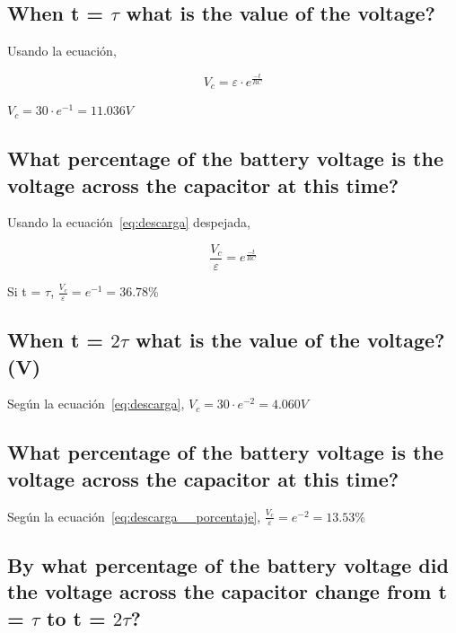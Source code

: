 \documentclass[twocolumn, 12pt]{article}
\begin{document}
\subsection{When t = $\tau$ what is the value of the voltage?}

Usando la ecuación,

{\large
        \begin{equation}
            V_c = \varepsilon \cdot e^{\frac{-t}{RC}}
        \end{equation}
        \label{eq:descarga}
    }

$V_c = 30 \cdot e^{-1} = 11.036V$

\subsection{What percentage of the battery voltage is the voltage across the capacitor at this time?}

Usando la ecuación~\eqref{eq:descarga} despejada,

{\large
        \begin{equation}
            \frac{V_c}{\varepsilon} = e^{\frac{-t}{RC}}
        \end{equation}
        \label{eq:descarga__porcentaje}
    }

Si t = $\tau$, $\frac{V_c}{\varepsilon} = e^{-1} = 36.78\%$

\subsection{When t = $2\tau$ what is the value of the voltage? (V)}

Según la ecuación~\eqref{eq:descarga}, $V_c = 30 \cdot
    e^{-2} = 4.060V$

\subsection{What percentage of the battery voltage is the voltage across the capacitor at this time?}

Según la ecuación~\eqref{eq:descarga__porcentaje},
$\frac{V_c}{\varepsilon} = e^{-2} = 13.53\%$

\subsection{By what percentage of the battery voltage did the voltage across the capacitor change
    from t = $\tau$ to t = $2\tau$?}
\end{document}
